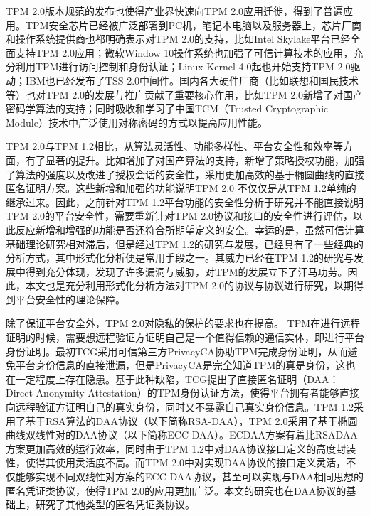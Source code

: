 TPM 2.0版本规范的发布也使得产业界快速向TPM 2.0应用迁徙，得到了普遍应用。TPM安全芯片已经被广泛部署到PC机，笔记本电脑以及服务器上，芯片厂商和操作系统提供商也都明确表示对TPM 2.0的支持，比如Intel Skylake平台已经全面支持TPM 2.0应用；微软Window 10操作系统也加强了可信计算技术的应用，充分利用TPM进行访问控制和身份认证；Linux Kernel 4.0起也开始支持TPM 2.0驱动；IBM也已经发布了TSS 2.0中间件。国内各大硬件厂商（比如联想和国民技术等）也对TPM 2.0的发展与推广贡献了重要核心作用，比如TPM 2.0新增了对国产密码学算法的支持；同时吸收和学习了中国TCM（Trusted Cryptographic Module）技术中广泛使用对称密码的方式以提高应用性能。

TPM 2.0与TPM 1.2相比，从算法灵活性、功能多样性、平台安全性和效率等方面，有了显著的提升。比如增加了对国产算法的支持，新增了策略授权功能，加强了算法的强度以及改进了授权会话的安全性，采用更加高效的基于椭圆曲线的直接匿名证明方案。这些新增和加强的功能说明TPM 2.0 不仅仅是从TPM 1.2单纯的继承过来。因此，之前针对TPM 1.2平台功能的安全性分析于研究并不能直接说明TPM 2.0的平台安全性，需要重新针对TPM 2.0协议和接口的安全性进行评估，以此反应新增和增强的功能是否还符合所期望定义的安全。幸运的是，虽然可信计算基础理论研究相对滞后，但是经过TPM 1.2的研究与发展，已经具有了一些经典的分析方式，其中形式化分析便是常用手段之一。其威力已经在TPM 1.2的研究与发展中得到充分体现，发现了许多漏洞与威胁，对TPM的发展立下了汗马功劳。因此，本文也是充分利用形式化分析方法对TPM 2.0的协议与协议进行研究，以期得到平台安全性的理论保障。

除了保证平台安全外，TPM 2.0对隐私的保护的要求也在提高。 TPM在进行远程证明的时候，需要想远程验证方证明自己是一个值得信赖的通信实体，即进行平台身份证明。最初TCG采用可信第三方PrivacyCA协助TPM完成身份证明，从而避免平台身份信息的直接泄漏，但是PrivacyCA是完全知道TPM的真是身份，这也在一定程度上存在隐患。基于此种缺陷，TCG提出了直接匿名证明（DAA：Direct Anonymity Attestation）的TPM身份认证方法，使得平台拥有者能够直接向远程验证方证明自己的真实身份，同时又不暴露自己真实身份信息。TPM 1.2采用了基于RSA算法的DAA协议（以下简称RSA-DAA），TPM 2.0采用了基于椭圆曲线双线性对的DAA协议（以下简称ECC-DAA）。ECDAA方案有着比RSADAA方案更加高效的运行效率，同时由于TPM 1.2中对DAA协议接口定义的高度封装性，使得其使用灵活度不高。而TPM 2.0中对实现DAA协议的接口定义灵活，不仅能够实现不同双线性对方案的ECC-DAA协议，甚至可以实现与DAA相同思想的匿名凭证类协议，使得TPM 2.0的应用更加广泛。本文的研究也在DAA协议的基础上，研究了其他类型的匿名凭证类协议。


